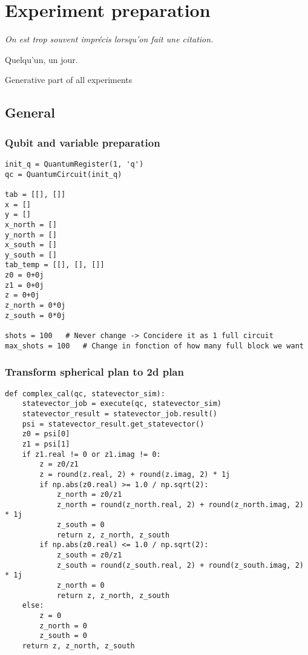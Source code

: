 \chapter{Experiment preparation}

\epigraph{\textit{On est trop souvent imprécis lorsqu'on fait une citation.}}{Quelqu'un, un jour.}

Generative part of all experiments

\section{General}

\subsection{Qubit and variable preparation}
\begin{lstlisting}
init_q = QuantumRegister(1, 'q')
qc = QuantumCircuit(init_q)

tab = [[], []]
x = []
y = []
x_north = []
y_north = []
x_south = []
y_south = []
tab_temp = [[], [], []]
z0 = 0+0j
z1 = 0+0j
z = 0+0j
z_north = 0*0j
z_south = 0*0j

shots = 100   # Never change -> Concidere it as 1 full circuit
max_shots = 100   # Change in fonction of how many full block we want 
\end{lstlisting}

\subsection{Transform spherical plan to 2d plan}

\begin{lstlisting}
def complex_cal(qc, statevector_sim):
    statevector_job = execute(qc, statevector_sim)
    statevector_result = statevector_job.result()
    psi = statevector_result.get_statevector()
    z0 = psi[0]
    z1 = psi[1]
    if z1.real != 0 or z1.imag != 0:
        z = z0/z1
        z = round(z.real, 2) + round(z.imag, 2) * 1j
        if np.abs(z0.real) >= 1.0 / np.sqrt(2):
            z_north = z0/z1
            z_north = round(z_north.real, 2) + round(z_north.imag, 2) * 1j
            z_south = 0
            return z, z_north, z_south
        if np.abs(z0.real) <= 1.0 / np.sqrt(2):
            z_south = z0/z1
            z_south = round(z_south.real, 2) + round(z_south.imag, 2) * 1j
            z_north = 0
            return z, z_north, z_south
    else:
        z = 0
        z_north = 0
        z_south = 0
    return z, z_north, z_south
\end{lstlisting}

